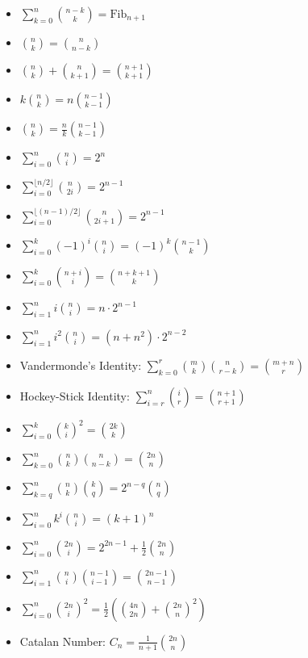 \begin{itemize}
  \item $\displaystyle \sum_{k=0}^{n} \binom{n-k}{k} = \text{Fib}_{n+1}$
  \item $\displaystyle \binom{n}{k} = \binom{n}{n-k}$
  \item $\displaystyle \binom{n}{k} + \binom{n}{k+1} = \binom{n+1}{k+1}$
  \item $\displaystyle k \binom{n}{k} = n \binom{n-1}{k-1}$
  \item $\displaystyle \binom{n}{k} = \frac{n}{k} \binom{n-1}{k-1}$
  \item $\displaystyle \sum_{i=0}^{n} \binom{n}{i} = 2^n$
  \item $\displaystyle \sum_{i=0}^{\lfloor n/2 \rfloor} \binom{n}{2i} = 2^{n-1}$
  \item $\displaystyle \sum_{i=0}^{\lfloor (n-1)/2 \rfloor} \binom{n}{2i+1} = 2^{n-1}$
  \item $\displaystyle \sum_{i=0}^{k} (-1)^i \binom{n}{i} = (-1)^k \binom{n-1}{k}$
  \item $\displaystyle \sum_{i=0}^{k} \binom{n+i}{i} = \binom{n+k+1}{k}$
  \item $\displaystyle \sum_{i=1}^{n} i \binom{n}{i} = n \cdot 2^{n-1}$
  \item $\displaystyle \sum_{i=1}^{n} i^2 \binom{n}{i} = (n + n^2) \cdot 2^{n-2}$
  \item Vandermonde's Identity: $\displaystyle \sum_{k=0}^{r} \binom{m}{k} \binom{n}{r-k} = \binom{m+n}{r}$
  \item Hockey-Stick Identity: $\displaystyle \sum_{i=r}^{n} \binom{i}{r} = \binom{n+1}{r+1}$
  \item $\displaystyle \sum_{i=0}^{k} \binom{k}{i}^2 = \binom{2k}{k}$
  \item $\displaystyle \sum_{k=0}^{n} \binom{n}{k} \binom{n}{n-k} = \binom{2n}{n}$
  \item $\displaystyle \sum_{k=q}^{n} \binom{n}{k} \binom{k}{q} = 2^{n-q} \binom{n}{q}$
  \item $\displaystyle \sum_{i=0}^{n} k^i \binom{n}{i} = (k+1)^n$
  \item $\displaystyle \sum_{i=0}^{n} \binom{2n}{i} = 2^{2n-1} + \frac{1}{2} \binom{2n}{n}$
  \item $\displaystyle \sum_{i=1}^{n} \binom{n}{i} \binom{n-1}{i-1} = \binom{2n-1}{n-1}$
  \item $\displaystyle \sum_{i=0}^{n} \binom{2n}{i}^2 = \frac{1}{2} \left( \binom{4n}{2n} + \binom{2n}{n}^2 \right)$
  \item Catalan Number: $\displaystyle C_n = \frac{1}{n+1} \binom{2n}{n}$

\end{itemize}
